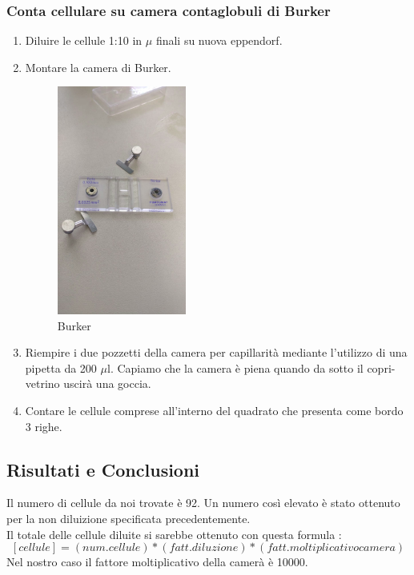 \subsubsection{Conta cellulare su camera contaglobuli di Burker}
\begin{enumerate}
    \item Diluire le cellule 1:10 in $\mu$ finali su nuova eppendorf.
    \item Montare la camera di Burker.

    \begin{figure}[H]
    \centering
    \includegraphics[width = 0.4\textwidth]{./immagini/Burker.png}
    \caption{Burker}
    \end{figure}

    \item Riempire i due pozzetti della camera per capillarità mediante l'utilizzo di 
    una pipetta da 200 $\mu$l. Capiamo che la camera è piena quando da sotto il 
    copri-vetrino uscirà una goccia.
    \item Contare le cellule comprese all'interno del quadrato che presenta come bordo 3 
    righe.
\end{enumerate}

\subsection{Risultati e Conclusioni}

Il numero di cellule da noi trovate è 92. Un numero così elevato è stato ottenuto per la 
non diluizione specificata precedentemente. \\
Il totale delle cellule diluite si sarebbe ottenuto con questa formula :
    $$[cellule] = (num. cellule)*(fatt. diluzione)*(fatt. moltiplicativo camera)$$
Nel nostro caso il fattore moltiplicativo della camerà è 10000.


